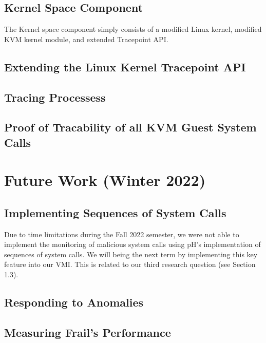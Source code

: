 \documentclass{report}
\begin{document}
\begin{spacing}{1.5}
\section{Kernel Space Component}

{\large
The Kernel space component simply consists of a modified Linux kernel, modified KVM kernel module, and extended Tracepoint API.
\newline
}

\section{Extending the Linux Kernel Tracepoint API}
\section{Tracing Processess}
\section{Proof of Tracability of all KVM Guest System Calls}






\chapter{Future Work (Winter 2022)}

\section{Implementing Sequences of System Calls}

{\large
Due to time limitations during the Fall 2022 semester, we were not able to implement the monitoring of malicious system calls using pH's implementation of sequences of system calls. We will being the next term by implementing this key feature into our VMI. This is related to our third research question (see Section 1.3).
\newline
}

\section{Responding to Anomalies}



\section{Measuring Frail's Performance}


\end{spacing}
\end{document}
